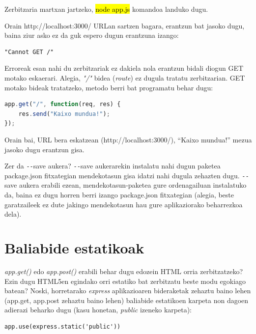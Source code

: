 Zerbitzaria martxan jartzeko, \hl{node app.js} komandoa landuko dugu.

Orain http://localhost:3000/ URLan sartzen bagara, erantzun bat jasoko dugu, baina ziur asko ez da guk espero dugun erantzuna izango:

\begin{lstlisting}[numbers=none]
"Cannot GET /"
\end{lstlisting}

Erroreak esan nahi du zerbitzariak ez dakiela nola erantzun bidali diogun GET motako eskaerari. Alegia, \textit{"/"} bidea (\textit{route}) ez dugula tratatu zerbitzarian.  GET motako bideak tratatzeko, metodo berri bat programatu behar dugu:

\begin{lstlisting}[language=JavaScript]
app.get("/", function(req, res) {
	res.send("Kaixo mundua!");
});
\end{lstlisting}

Orain bai, URL bera eskatzean (http://localhost:3000/), ``Kaixo mundua!'' mezua jasoko dugu erantzun gisa.

\begin{alertinfo}{Zer da \texttt{-{}-}save aukera?}
  \texttt{-{}-}save aukerarekin instalatu nahi dugun paketea package.json fitxategian mendekotasun gisa idatzi nahi dugula zehazten dugu. \texttt{-{}-}save aukera erabili ezean, mendekotasun-paketea gure ordenagailuan instalatuko da, baina ez dugu horren berri izango package.json fitxategian (alegia, beste garatzaileek ez dute jakingo mendekotasun hau gure aplikaziorako beharrezkoa dela).
\end{alertinfo}

\section{Baliabide estatikoak}

\textit{app.get()} edo  \textit{app.post()} erabili behar dugu edozein HTML orria zerbitzatzeko? Ezin dugu HTML5en egindako orri estatiko bat zerbitzatu beste modu egokiago batean? Noski, horretarako \textit{express} aplikazioaren bideraketak zehaztu baino lehen (app.get, app.post zehaztu baino lehen) baliabide estatikoen karpeta non dagoen adierazi beharko dugu (kasu honetan, \textit{public} izeneko karpeta):

\begin{lstlisting}
app.use(express.static('public'))
\end{lstlisting}

